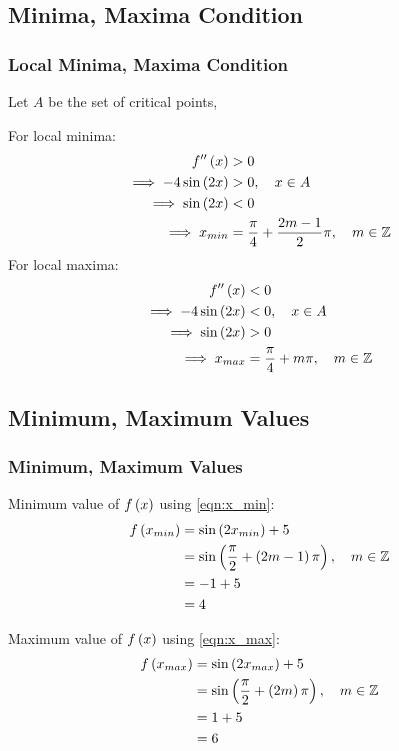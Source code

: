 \documentclass{beamer}
\numberwithin{equation}{section}
\begin{document}
\subsection{Minima, Maxima Condition}
\begin{frame}
\frametitle{Local Minima, Maxima Condition}
Let $A$ be the set of critical points,

For local minima:
\begin{align}
	f^{\prime\prime}\left(x\right) &> 0 \\
	\implies -4\sin{\ensuremath{\left(2x\right)}} &> 0 ,\quad x \in A \\
	\implies \sin{\ensuremath{\left(2x\right)}} &< 0 \\
	\implies x_{min} &= \frac{\pi}{4} + \frac{2m-1}{2}\pi, \quad m \in \mathbb{Z} \label{eqn:x_min}
\end{align}
For local maxima:
\begin{align}
	f^{\prime\prime}\left(x\right) &< 0 \\
	\implies -4\sin{\ensuremath{\left(2x\right)}} &< 0 ,\quad x \in A \\
	\implies \sin{\ensuremath{\left(2x\right)}} &> 0 \\
	\implies x_{max} &= \frac{\pi}{4} + m\pi, \quad m \in \mathbb{Z} \label{eqn:x_max}
\end{align}
\end{frame}

\subsection{Minimum, Maximum Values}
\begin{frame}
\frametitle{Minimum, Maximum Values}
Minimum value of $f\left(x\right)$ using \eqref{eqn:x_min}:
\begin{align}
	f\left(x_{min}\right) &= \sin\left(2x_{min}\right) + 5 \\
	&= \sin\left(\frac{\pi}{2} + \left(2m-1\right)\pi\right), \quad m \in \mathbb{Z} \\
	&= -1 + 5 \\
	&= 4
\end{align}

Maximum value of $f\left(x\right)$ using \eqref{eqn:x_max}:
\begin{align}
	f\left(x_{max}\right) &= \sin\left(2x_{max}\right) + 5 \\
	&= \sin\left(\frac{\pi}{2} + \left(2m\right)\pi\right), \quad m \in \mathbb{Z} \\
	&= 1 + 5 \\
	&= 6
\end{align}
\end{frame}
\end{document}
